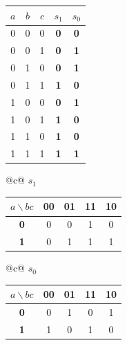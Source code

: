 \documentclass[12pt, a4paper]{article}
\begin{document}
\begin{center}
\renewcommand{\arraystretch}{1.25}
\begin{tabular}[t]{|ccc||cc|}
\hline
\colorbox{gray!25}{\color{black}$a$} & \colorbox{gray!25}{\color{black}$b$} & \colorbox{gray!25}{\color{black}$c$} & \colorbox{gray!25}{\color{black}$s_1$} & \colorbox{gray!25}{\color{black}$s_0$} \\ \hline
0 & 0 & 0 & \textbf{0} & \textbf{0} \\ \hline
0 & 0 & 1 & \textbf{0} & \textbf{1} \\ \hline
0 & 1 & 0 & \textbf{0} & \textbf{1} \\ \hline
0 & 1 & 1 & \textbf{1} & \textbf{0} \\ \hline
1 & 0 & 0 & \textbf{0} & \textbf{1} \\ \hline
1 & 0 & 1 & \textbf{1} & \textbf{0} \\ \hline
1 & 1 & 0 & \textbf{1} & \textbf{0} \\ \hline
1 & 1 & 1 & \textbf{1} & \textbf{1} \\ \hline
\end{tabular}
\end{center}
\begin{center}
\renewcommand{\arraystretch}{1.25}
\begin{tabular}[t]{@{}c@{}}
$s_1$\\[3pt]
\begin{tabular}[t]{|c|c|c|c|c|}
\hline
\colorbox{gray!25}{\color{black}$a\backslash bc$} & \colorbox{gray!25}{\color{black}\textbf{00}} & \colorbox{gray!25}{\color{black}\textbf{01}} & \colorbox{gray!25}{\color{black}\textbf{11}} & \colorbox{gray!25}{\color{black}\textbf{10}} \\ \hline
\colorbox{gray!25}{\color{black}\textbf{0}} & 0 & 0 & 1 & 0 \\ \hline
\colorbox{gray!25}{\color{black}\textbf{1}} & 0 & 1 & 1 & 1 \\ \hline
\end{tabular}
\end{tabular}
\qquad
\begin{tabular}[t]{@{}c@{}}
$s_0$\\[3pt]
\begin{tabular}[t]{|c|c|c|c|c|}
\hline
\colorbox{gray!25}{\color{black}$a\backslash bc$} & \colorbox{gray!25}{\color{black}\textbf{00}} & \colorbox{gray!25}{\color{black}\textbf{01}} & \colorbox{gray!25}{\color{black}\textbf{11}} & \colorbox{gray!25}{\color{black}\textbf{10}} \\ \hline
\colorbox{gray!25}{\color{black}\textbf{0}} & 0 & 1 & 0 & 1 \\ \hline
\colorbox{gray!25}{\color{black}\textbf{1}} & 1 & 0 & 1 & 0 \\ \hline
\end{tabular}
\end{tabular}
\end{center}
\end{document}
